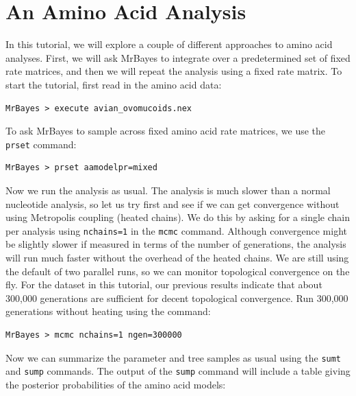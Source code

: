 \documentclass[12pt]{book}
\begin{document}
\section{An Amino Acid Analysis}

In this tutorial, we will explore a couple of different approaches to amino acid analyses. First,
we will ask MrBayes to integrate over a predetermined set of fixed rate matrices, and then we will
repeat the analysis using a fixed rate matrix. To start the tutorial, first read in the amino acid
data:

\begin{singlespacing}\small
\begin{verbatim}
MrBayes > execute avian_ovomucoids.nex
\end{verbatim}
\normalsize
\end{singlespacing}

To ask MrBayes to sample across fixed amino acid rate matrices, we use the \texttt{prset} command:

\begin{singlespacing}\small
\begin{verbatim}
MrBayes > prset aamodelpr=mixed
\end{verbatim}
\normalsize
\end{singlespacing}

Now we run the analysis as usual. The analysis is much slower than a normal nucleotide analysis, so
let us try first and see if we can get convergence without using Metropolis coupling (heated
chains). We do this by asking for a single chain per analysis using \texttt{nchains=1} in the
\texttt{mcmc} command. Although convergence might be slightly slower if measured in terms of the
number of generations, the analysis will run much faster without the overhead of the heated chains.
We are still using the default of two parallel runs, so we can monitor topological convergence on
the fly. For the dataset in this tutorial, our previous results indicate that about 300,000
generations are sufficient for decent topological convergence. Run 300,000 generations without
heating using the command:

\begin{singlespacing}\small
\begin{verbatim}
MrBayes > mcmc nchains=1 ngen=300000
\end{verbatim}
\normalsize
\end{singlespacing}

Now we can summarize the parameter and tree samples as usual using the \texttt{sumt} and \texttt{sump}
commands. The output of the \texttt{sump} command will include a table giving the posterior
probabilities of the amino acid models:
\end{document}
